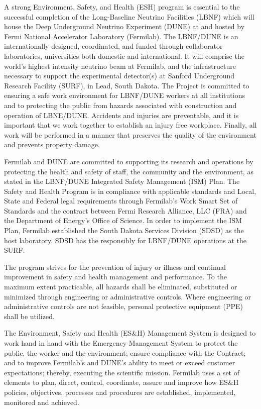 A strong Environment, Safety, and Health (ESH) program is essential to
the successful completion of the Long-Baseline Neutrino Facilities
(LBNF) which will house the Deep Underground Neutrino Experiment
(DUNE) at and hosted by Fermi National Accelerator Laboratory
(Fermilab).  The LBNF/DUNE is an internationally designed,
coordinated, and funded through collaborator laboratories,
universities both domestic and international.  It will comprise the
world’s highest intensity neutrino beam at Fermilab, and the
infrastructure necessary to support the experimental detector(s) at
Sanford Underground Research Facility (SURF), in Lead, South Dakota.
The Project is committed to ensuring a safe work environment for
LBNF/DUNE workers at all institutions and to protecting the public
from hazards associated with construction and operation of LBNE/DUNE.
Accidents and injuries are preventable, and it is important that we
work together to establish an injury free workplace.  Finally, all
work will be performed in a manner that preserves the quality of the
environment and prevents property damage.

Fermilab and DUNE are committed to supporting its research and
operations by protecting the health and safety of staff, the community
and the environment, as stated in the LBNF/DUNE Integrated Safety
Management (ISM) Plan. The Safety and Health Program is in compliance
with applicable standards and Local, State and Federal legal
requirements through Fermilab's Work Smart Set of Standards and the
contract between Fermi Research Alliance, LLC (FRA) and the Department
of Energy’s Office of Science.  In order to implement the ISM Plan,
Fermilab established the South Dakota Services Division (SDSD) as the
host laboratory.  SDSD has the responsibly for LBNF/DUNE operations at
the SURF.

The program strives for the prevention of injury or illness and
continual improvement in safety and health management and performance.
To the maximum extent practicable, all hazards shall be eliminated,
substituted or minimized through engineering or administrative
controls.  Where engineering or administrative controls are not
feasible, personal protective equipment (PPE) shall be utilized.

The Environment, Safety and Health (ES\&H) Management System is
designed to work hand in hand with the Emergency Management System to
protect the public, the worker and the environment; ensure compliance
with the Contract; and to improve Fermilab’s and DUNE’s ability to
meet or exceed customer expectations; thereby, executing the
scientific mission.  Fermilab uses a set of elements to plan, direct,
control, coordinate, assure and improve how ES\&H policies, objectives,
processes and procedures are established, implemented, monitored and
achieved.

